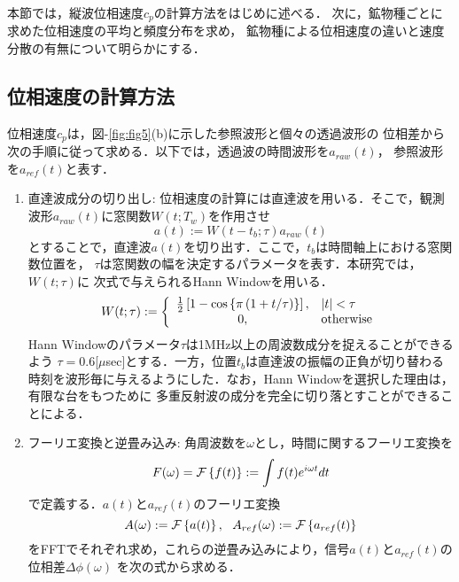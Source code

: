 ﻿本節では，縦波位相速度$c_p$の計算方法をはじめに述べる．
次に，鉱物種ごとに求めた位相速度の平均と頻度分布を求め，
鉱物種による位相速度の違いと速度分散の有無について明らかにする．
\subsection{位相速度の計算方法}
位相速度$c_p$は，図-\ref{fig:fig5}(b)に示した参照波形と個々の透過波形の
位相差から次の手順に従って求める．以下では，透過波の時間波形を$a_{raw}(t)$，
参照波形を$a_{ref}(t)$と表す．
\begin{enumerate}
\item
直達波成分の切り出し: 
位相速度の計算には直達波を用いる．そこで，観測波形$a_{raw}(t)$に窓関数$W(t;T_w)$を作用させ
\begin{equation}
	a(t):=W(t-t_b;\tau)a_{raw}(t)
\end{equation}
とすることで，直達波$a(t)$を切り出す．ここで，$t_b$は時間軸上における窓関数位置を，
$\tau$は窓関数の幅を決定するパラメータを表す．本研究では，$W(t;\tau)$に
次式で与えられるHann Windowを用いる．
\begin{equation}
	W(t;\tau):=\left\{
	\begin{array}{cl}
		\frac{1}{2}\left[ 1-\cos \left\{ \pi\left(1+t/\tau \right) \right\} \right],
		 & \left| t \right| < \tau \\
		0, & {\rm otherwise}
	\end{array}
	\right.
\end{equation}
Hann Windowのパラメータ$\tau$は1MHz以上の周波数成分を捉えることができるよう
$\tau=0.6$[$\mu$sec]とする．一方，位置$t_b$は直達波の振幅の正負が切り替わる
時刻を波形毎に与えるようにした．なお，Hann Windowを選択した理由は，有限な台をもつために
多重反射波の成分を完全に切り落とすことができることによる．
\item
フーリエ変換と逆畳み込み:
角周波数を$\omega$とし，時間に関するフーリエ変換を
	\begin{equation}
		F(\omega) ={\cal F} \left\{ f(t)\right\}:=\int f(t) e^{i\omega t}dt 
		\label{eqn:Fourier}
	\end{equation}
で定義する．$a(t)$と$a_{ref}(t)$のフーリエ変換
	\begin{equation}
		A(\omega):={\cal F} \left\{ a(t) \right\}, \ \ 
		A_{ref}(\omega):={\cal F} \left\{ a_{ref} (t)\right\}
	\end{equation}
をFFTでそれぞれ求め，これらの逆畳み込みにより，信号$a(t)$と$a_{ref}(t)$の位相差$\Delta \phi(\omega)$
を次の式から求める．
\begin{equation}

\end{equation}
\end{enumerate}
